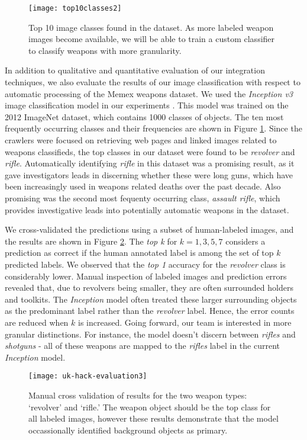 \begin{figure}
	\texttt{[image: top10classes2]}
	\caption{Top 10 image classes found in the dataset. As more labeled weapon images become available, we will be able to train a custom classifier to classify weapons with more granularity.}
	\label{fig:top10ImgClass}
\end{figure}


In addition to qualitative and quantitative evaluation of our integration techniques, we also evaluate the results of our image classification with respect to automatic processing of the Memex weapons dataset.  We used the \textit{Inception v3} image classification model in our experiments \cite{SzegedyVISW15}. This model was trained on the 2012 ImageNet dataset, which contains 1000 classes of objects\cite{ILSVRC15}. The ten most frequently occurring classes and their frequencies are shown in Figure \ref{fig:top10ImgClass}. Since the crawlers were focused on retrieving web pages and linked images related to weapons classifieds, the top classes in our dataset were found to be \textit{revolver} and \textit{rifle}. Automatically identifying \textit{rifle} in this dataset was a promising result, as it gave investigators leads in discerning whether these were long guns, which have been increasingly used in weapons related deaths over the past decade. Also promising was the second most fequenty occurring class, \textit{assault rifle}, which provides investigative leads into potentially automatic weapons in the dataset.

We cross-validated the predictions using a subset of human-labeled images, and the results are shown in Figure \ref{fig:uk-hack-eval}. The \textit{top k} for $k=1,3,5,7$ considers a prediction as correct if the human annotated label is among the set of top $k$  predicted labels. We observed that the \textit{top 1} accuracy for the \textit{revolver} class is considerably lower. Manual inspection of labeled images and prediction errors revealed that, due to revolvers being smaller, they are often surrounded holders and toolkits. The \textit{Inception} model often treated these larger surrounding objects as the predominant label rather than the \textit{revolver} label. Hence, the error counts are reduced when $k$ is increased. Going forward, our team is interested in more granular distinctions. For instance, the model doesn't discern between \textit{rifles} and \textit{shotguns} - all of these weapons are mapped to the \textit{rifles} label in the current \textit{Inception} model. 

\begin{figure}
	\texttt{[image: uk-hack-evaluation3]}
	\caption{Manual cross validation of results for the two weapon types: `revolver' and `rifle.' The weapon object should be the top class for all labeled images, however these results demonstrate that the model occassionally identified background objects as primary.}
	\label{fig:uk-hack-eval}
\end{figure}

